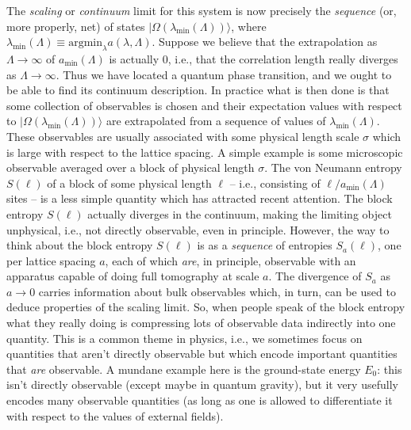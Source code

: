 \documentclass[11pt]{amsart}
\theoremstyle{plain}%
\theoremstyle{definition}
\theoremstyle{remark}
\begin{document}
The \emph{scaling} or \emph{continuum} limit for this system is now precisely the \emph{sequence} (or, more properly, net) of states $|\Omega(\lambda_{\text{min}}(\Lambda))\rangle$, where  $\lambda_{\text{min}}(\Lambda) \equiv \text{argmin}_{\lambda} a(\lambda, \Lambda)$. Suppose we believe that the extrapolation as $\Lambda \rightarrow \infty$ of $a_{\text{min}}(\Lambda)$ is actually $0$, i.e., that the correlation length really diverges as $\Lambda\rightarrow \infty$. Thus we have located a quantum phase transition, and we ought to be able to find its continuum description. In practice what is then done is that some collection of observables is chosen and their expectation values with respect to $|\Omega(\lambda_{\text{min}}(\Lambda))\rangle$ are extrapolated from a sequence of values of $\lambda_{\text{min}}(\Lambda)$. These observables are usually associated with some physical length scale $\sigma$ which is large with respect to the lattice spacing. A simple example is some microscopic observable averaged over a block of physical length $\sigma$. The von Neumann entropy $S(\ell)$ of a block of some physical length $\ell$ -- i.e., consisting of $\ell/a_{\text{min}}(\Lambda)$ sites -- is a less simple quantity which has attracted recent attention. The block entropy $S(\ell)$ actually diverges in the continuum, making the limiting object unphysical, i.e., not directly observable, even in principle. However, the way to think about the block entropy $S(\ell)$ is as a \emph{sequence} of entropies $S_a(\ell)$, one per lattice spacing $a$, each of which \emph{are}, in principle, observable with an apparatus capable of doing full tomography at scale $a$. The divergence of $S_a$ as $a\rightarrow 0$ carries information about bulk observables which, in turn, can be used to deduce properties of the scaling limit. So, when people speak of the block entropy what they really doing is compressing lots of observable data indirectly into one quantity. This is a common theme in physics, i.e., we sometimes focus on quantities that aren't directly observable but which encode important quantities that \emph{are} observable. A mundane example here is the ground-state energy $E_0$: this isn't directly observable (except maybe in quantum gravity), but it very usefully encodes many observable quantities (as long as one is allowed to differentiate it with respect to the values of external fields). 
\end{document}
